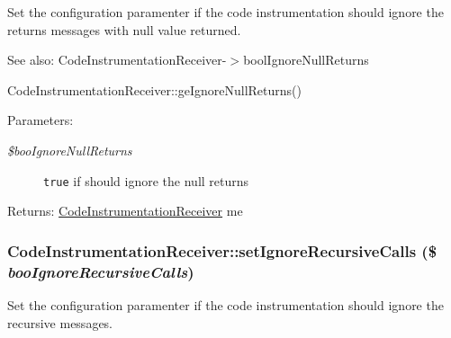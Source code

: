 Set the configuration paramenter if the code instrumentation should ignore the returns messages with null value returned.

\begin{Desc}
\item[See also:]CodeInstrumentationReceiver-$>$boolIgnoreNullReturns 

CodeInstrumentationReceiver::geIgnoreNullReturns() \end{Desc}
\begin{Desc}
\item[Parameters:]
\begin{description}
\item[{\em \$booIgnoreNullReturns}]{\tt true} if should ignore the null returns \end{description}
\end{Desc}
\begin{Desc}
\item[Returns:]\hyperlink{class_code_instrumentation_receiver}{CodeInstrumentationReceiver} me \end{Desc}
\hypertarget{class_code_instrumentation_receiver_d9b3988e912a93b15037235ee4150e5a}{
\subsubsection[{setIgnoreRecursiveCalls}]{\setlength{\rightskip}{0pt plus 5cm}CodeInstrumentationReceiver::setIgnoreRecursiveCalls (\$ {\em booIgnoreRecursiveCalls})}}
\label{class_code_instrumentation_receiver_d9b3988e912a93b15037235ee4150e5a}


Set the configuration paramenter if the code instrumentation should ignore the recursive messages.

